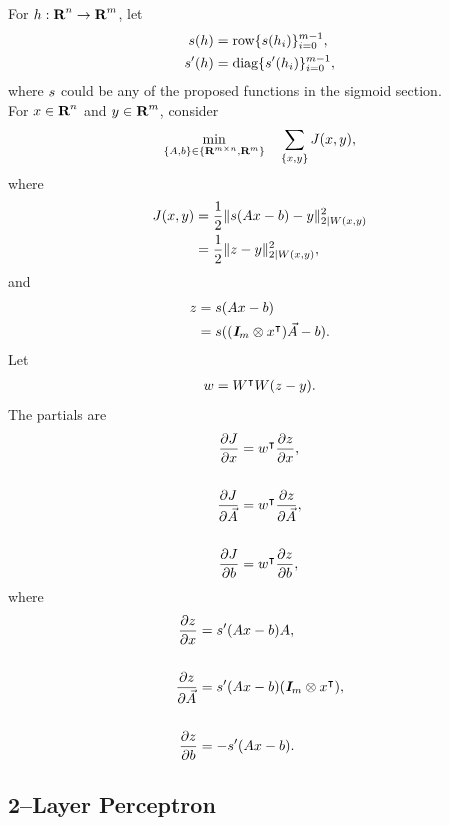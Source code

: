 \documentclass{article}
\begin{document}
    For $h:\textbf{R}^n\to\textbf{R}^m$, let
    \begin{align*}
        s(h)&=\text{row}\{s(h_i)\}_{i=0}^{m-1},\\
        s'(h)&=\text{diag}\{s'(h_i)\}_{i=0}^{m-1},
    \end{align*}
    where $s$ could be any of the proposed functions in the sigmoid section.\\
    For $x\in\textbf{R}^n$ and $y\in\textbf{R}^m$, consider
    \begin{align*}
        \min_{\{A,b\}\in\{\textbf{R}^{m\times n},\textbf{R}^m\}}\quad 
        \sum_{\{x,y\}} J (x,y),
    \end{align*}
    where
    \begin{align*}
        J(x,y)&=\frac{1}{2}\|s(Ax -b)-y \|_{2|W(x,y)}^2\\
        &=\frac{1}{2}\|z-y \|_{2|W(x,y)}^2,            
    \end{align*}
    and
    \begin{align*}
        z&=s(Ax-b)\\
        &=s((\emph{\textbf{I}}_m\otimes x ^\intercal)\vec{A}-b).
    \end{align*}
    Let
    \begin{align*}
        w=W^\intercal W(z-y ).
    \end{align*}
    The partials are
    \begin{align*}
        \frac{\partial  J }{\partial x}&=w^\intercal \frac{\partial z}{\partial x},\\\\
        \frac{\partial  J }{\partial \vec{A}}&=w^\intercal  \frac{\partial z}{\partial \vec{A}},\\\\
        \frac{\partial  J }{\partial b}&=w^\intercal \frac{\partial z}{\partial b},
    \end{align*}
    where
    \begin{align*}
        \frac{\partial z}{\partial x}&=s'(Ax-b)A,\\\\
        \frac{\partial z}{\partial \vec{A}}&=s'(Ax-b)(\emph{\textbf{I}}_m\otimes x ^\intercal),\\\\
        \frac{\partial z}{\partial b}&=-s'(Ax-b).
    \end{align*}

\subsection{2--Layer Perceptron}
\end{document}
